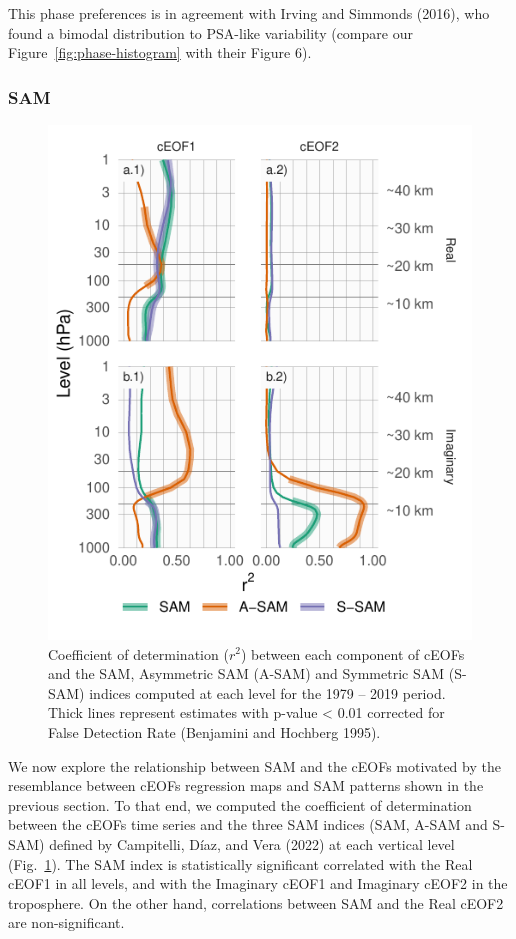 \documentclass[smallextended]{svjour3}       %
\begin{document}
This phase preferences is in agreement with Irving and Simmonds (2016), who found a bimodal distribution to PSA-like variability (compare our Figure~\ref{fig:phase-histogram} with their Figure 6).

\hypertarget{sam}{%
\subsubsection{SAM}\label{sam}}



\begin{figure}
\centering
\includegraphics{../figures/sam-eof-vertical-1.pdf}
\caption{\label{fig:sam-eof-vertical}Coefficient of determination (\(r^2\)) between each component of cEOFs and the SAM, Asymmetric SAM (A-SAM) and Symmetric SAM (S-SAM) indices computed at each level for the 1979 -- 2019 period. Thick lines represent estimates with p-value \textless{} 0.01 corrected for False Detection Rate (Benjamini and Hochberg 1995).}
\end{figure}

We now explore the relationship between SAM and the cEOFs motivated by the resemblance between cEOFs regression maps and SAM patterns shown in the previous section.
To that end, we computed the coefficient of determination between the cEOFs time series and the three SAM indices (SAM, A-SAM and S-SAM) defined by Campitelli, Díaz, and Vera (2022) at each vertical level (Fig.~\ref{fig:sam-eof-vertical}).
The SAM index is statistically significant correlated with the Real cEOF1 in all levels, and with the Imaginary cEOF1 and Imaginary cEOF2 in the troposphere.
On the other hand, correlations between SAM and the Real cEOF2 are non-significant.
\end{document}
